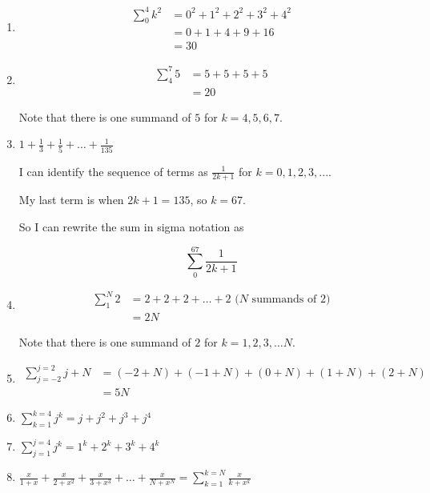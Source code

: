 \begin{solutions}
		\begin{enumerate}
				\item 
				\begin{align*}
					\displaystyle\sum_0^4 k^2 
					&= 0^2+1^2+2^2+3^2+4^2\\
					&= 0 + 1 + 4 + 9 + 16\\
					&=30
				\end{align*}
				\item 
\begin{align*}
	\displaystyle\sum_4^7 5 
	&=5+5+5+5 \\
	&=20
\end{align*}

Note that there is one summand of $5$ for $k=4, 5, 6, 7$.

\item  $1 + \frac{1}{3} + \frac{1}{5} + \dots + \frac{1}{135}$

 I can identify the sequence of terms as $\frac{1}{2k+1}$ for $k=0,1,2,3,...$.
 
 My last term is when $2k+1 = 135$, so $k=67$.
 
 So I can rewrite the sum in sigma notation as
 
 \[
 \sum_0^67 \frac{1}{2k+1}
 \]


				\item 
\begin{align*}
	\displaystyle\sum_1^N 2 
	&=2+2+2+\dots + 2  \textrm{ ($N$ summands of $2$)}\\
	&=2N
\end{align*}

Note that there is one summand of $2$ for $k=1, 2, 3, \dots N$.  

			\item 
			\begin{align*}
				\displaystyle\sum_{j=-2}^{j=2} j+N &= (-2+N)+(-1+N)+(0+N)+(1+N)+(2+N)\\
				&=5N
				\end{align*}
			
			\item $\displaystyle\sum_{k=1}^{k=4} j^k  = j+j^2+j^3+j^4$
			
			\item $\displaystyle\sum_{j=1}^{j=4} j^k = 1^k+2^k+3^k+4^k$
			
			\item $\frac{x}{1+x} + \frac{x}{2+x^2} + \frac{x}{3 + x^3} + \dots + \frac{x}{N + x^N} = \displaystyle \sum_{k=1}^{k=N} \frac{x}{k+x^k}$ 

			\end{enumerate}
		
		
	\end{solutions}
	
